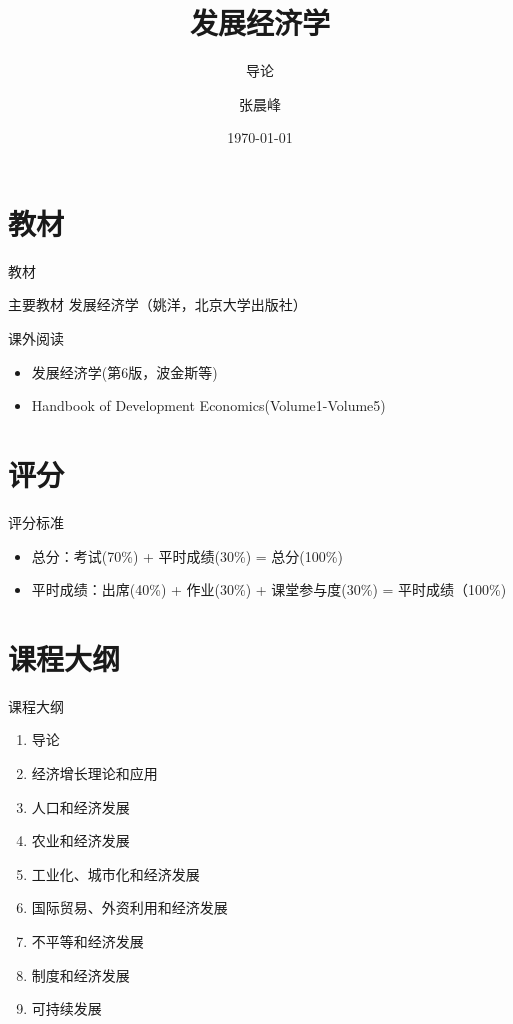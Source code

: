 \documentclass[UTF8,14pt,blue,hyperref={CJKbookmarks=true}]{beamer}
\begin{document}
\title{发展经济学}
\subtitle{导论}
\author{张晨峰}
\date{\today}

\begin{frame}
\titlepage
\end{frame}

\section{教材}
\begin{frame}{教材}
\begin{block}{主要教材}
发展经济学（姚洋，北京大学出版社）
\end{block}

\begin{block}{课外阅读}
\begin{itemize}
\item 发展经济学(第6版，波金斯等)
\item Handbook of Development Economics(Volume1-Volume5)
\end{itemize}
\end{block}
\end{frame}

\section{评分}
\begin{frame}{评分标准}
\begin{itemize}
\item 总分：考试(70\%) + 平时成绩(30\%) = 总分(100\%)
\item 平时成绩：出席(40\%) + 作业(30\%) + 课堂参与度(30\%) = 平时成绩（100\%)
\end{itemize}
\end{frame}

\section{课程大纲}
\begin{frame}{课程大纲}
\begin{enumerate}
\item 导论
\item 经济增长理论和应用
\item 人口和经济发展
\item 农业和经济发展
\item 工业化、城市化和经济发展
\item 国际贸易、外资利用和经济发展
\item 不平等和经济发展
\item 制度和经济发展
\item 可持续发展
\end{enumerate}
\end{frame}
\end{document}
